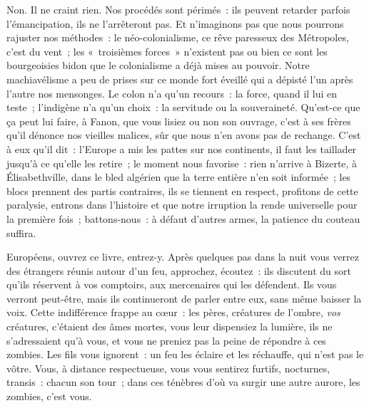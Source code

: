 \documentclass[french,twoside]{book} %
\begin{document}
Non. Il ne craint rien. Nos procédés sont périmés : ils peuvent retarder parfois l’émancipation, ils ne l’arrêteront pas. Et n’imaginons pas que nous pourrons rajuster nos méthodes : le néo-colonialisme, ce rêve paresseux des Métropoles, c’est du vent ; les « troisièmes forces » n’existent pas ou bien ce sont les bourgeoisies bidon que le colonialisme a déjà mises au pouvoir. Notre machiavélisme a peu de prises sur ce monde fort éveillé qui a dépisté l’un après l’autre nos mensonges. Le colon n’a qu’un recours : la force, quand il lui en teste ; l’indigène n’a qu’un choix : la servitude ou la souveraineté. Qu’est-ce que ça peut lui faire, à Fanon, que vous lisiez ou non son ouvrage, c’est à ses frères qu’il dénonce nos vieilles malices, sûr que nous n’en avons pas de rechange. C’est à eux qu’il dit : l’Europe a mis les pattes sur nos continents, il faut les taillader jusqu’à ce qu’elle les retire ; le moment nous favorise : rien n’arrive à Bizerte, à Élisabethville, dans le bled algérien que la terre entière n’en soit informée ; les blocs prennent des partis contraires, ils se tiennent en respect, profitons de cette paralysie, entrons dans l’histoire et que notre irruption la rende universelle pour la première fois ; battons-nous : à défaut d’autres armes, la patience du couteau suffira.\par
 Européens, ouvrez ce livre, entrez-y. Après quelques pas dans la nuit vous verrez des étrangers réunis autour d’un feu, approchez, écoutez : ils discutent du sort qu’ils réservent à vos comptoirs, aux mercenaires qui les défendent. Ils vous verront peut-être, mais ils continueront de parler entre eux, sans même baisser la voix. Cette indifférence frappe au cœur : les pères, créatures de l’ombre, \emph{vos} créatures, c’étaient des âmes mortes, vous leur dispensiez la lumière, ils ne s’adressaient qu’à vous, et vous ne preniez pas la peine de répondre à ces zombies. Les fils vous ignorent : un feu les éclaire et les réchauffe, qui n’est pas le vôtre. Vous, à distance respectueuse, vous vous sentirez furtifs, nocturnes, transis : chacun son tour ; dans ces ténèbres d’où va surgir une autre aurore, les zombies, c’est vous.\par
\end{document}
